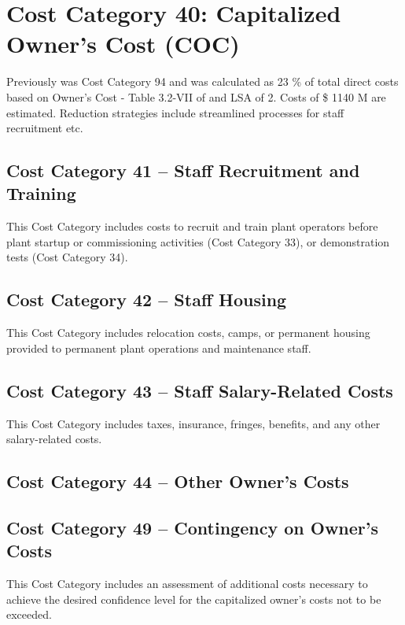\section{Cost Category 40: Capitalized Owner’s Cost (COC)}

Previously was Cost Category 94 and was calculated as 23 \% of total direct costs based on Owner's Cost - Table 3.2-VII of \cite{SCH78} and LSA of 2. Costs of \$ 1140 M are estimated. Reduction strategies include streamlined processes for staff recruitment etc. 

\subsection*{Cost Category 41 – Staff Recruitment and Training}
This Cost Category includes costs to recruit and train plant operators before plant startup or commissioning activities (Cost Category 33), or demonstration tests (Cost Category 34).

\subsection*{Cost Category 42 – Staff Housing}
This Cost Category includes relocation costs, camps, or permanent housing provided to permanent plant operations and maintenance staff.

\subsection*{Cost Category 43 – Staff Salary-Related Costs}
This Cost Category includes taxes, insurance, fringes, benefits, and any other salary-related costs.

\subsection*{Cost Category 44 – Other Owner’s Costs}

\subsection*{Cost Category 49 – Contingency on Owner’s Costs}
This Cost Category includes an assessment of additional costs necessary to achieve the desired confidence level for the capitalized owner’s costs not to be exceeded.
